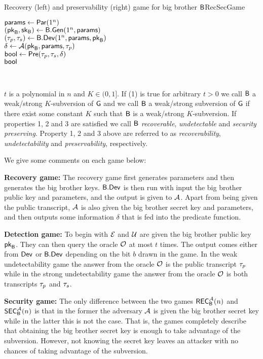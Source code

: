 \begin{defn}
\begin{enumerate}[1.]
\begin{boxfigTwo}{Recovery (left) and preservability (right) game for big brother $\mathsf{B}$}{RecSecGame}
\begin{minipage}{0.45\textwidth}
\begin{description}
 		$\mathsf{params} \leftarrow \operatorname{\mathsf{Par}}(1^n)$ \\
 		$(\mathsf{pk}_{\mathsf{B}},\mathsf{sk}_{\mathsf{B}})\leftarrow \mathsf{B}.\mathsf{Gen}(1^n,\mathsf{params})$ \\
 		$(\tau_p,\tau_s)\leftarrow \mathsf{B}.\mathsf{Dev}(1^n,\mathsf{params},\mathsf{pk}_{\mathsf{B}})$ \\
 		$\delta \leftarrow \mathcal{A}(\mathsf{pk}_{\mathsf{B}},\mathsf{params},\tau_p)$ \\
 		$\mathsf{bool} \leftarrow \operatorname{\mathsf{Pre}}(\tau_p,\tau_s,\delta)$ \\
		\Ret $\mathsf{bool}$
		\smallskip
  	\end{description}
\end{minipage}
\\
\end{boxfigTwo}
	\end{enumerate}
$t$ is a polynomial in $n$ and $K\in(0,1]$. If (1) is true for arbitrary $t>0$ we call $\mathsf{B}$ a weak/strong $K$-subversion of $\operatorname{\mathsf{G}}$ and we call $\mathsf{B}$ a weak/strong subversion of $\operatorname{\mathsf{G}}$ if there exist some constant $K$ such that $\mathsf{B}$ is a weak/strong $K$-subversion. If properties 1, 2 and 3 are satisfied we call $\mathsf{B}$ \emph{recoverable}, \emph{undetectable} and \emph{security preserving}. Property 1, 2 and 3 above are referred to as \emph{recoverability}, \emph{undetectability} and \emph{preservability}, respectively.
\end{defn}

We give some comments on each game below:

\noindent\textbf{Recovery game:} The recovery game first generates parameters and then generates the big brother keys. $\mathsf{B}.\mathsf{Dev}$ is then run with input the big brother public key and parameters, and the output is given to $\mathcal{A}$. Apart from being given the public transcript, $\mathcal{A}$ is also given the big brother secret key and parameters, and then outputs some information $\delta$ that is fed into the predicate function. 

\noindent\textbf{Detection game:} To begin with $\mathcal{E}$ and $\mathcal{U}$ are given the big brother public key $\mathsf{pk}_{\mathsf{B}}$. They can then query the oracle $\operatorname{\mathcal{O}}$ at most $t$ times. The output comes either from $\operatorname{\mathsf{Dev}}$ or $\mathsf{B}.\mathsf{Dev}$ depending on the bit $b$ drawn in the game. In the weak undetectability game the answer from the oracle $\operatorname{\mathcal{O}}$ is the public transcript $\tau_p$ while in the strong undetectability game the answer from the oracle $\operatorname{\mathcal{O}}$ is both transcripts $\tau_p$ and $\tau_s$.  

\noindent\textbf{Security game:} The only difference between the two games $\mathsf{REC}_{\mathsf{B}}^{\mathcal{A}}(n)$ and $\mathsf{SEC}_{\mathsf{B}}^{\mathcal{A}}(n)$ is that in the former the adversary $\mathcal{A}$ is given the big brother secret key while in the latter this is not the case. That is, the games completely describe that obtaining the big brother secret key is enough to take advantage of the subversion. However, not knowing the secret key leaves an attacker with no chances of taking advantage of the subversion.\\ 

